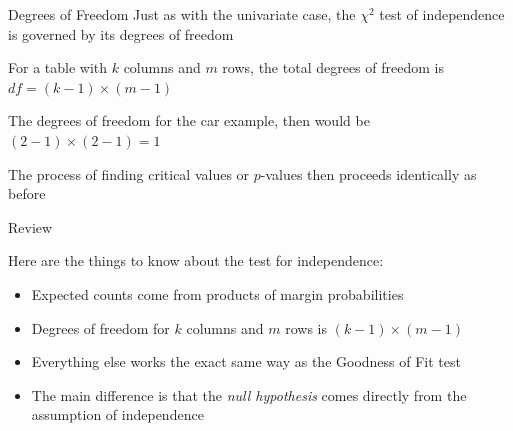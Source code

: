 \documentclass{beamer}
\begin{document}
\begin{frame}{Degrees of Freedom}
Just as with the univariate case, the $\chi^2$ test of independence is governed by its degrees of freedom \\ \vspace{4mm}

For a table with $k$ columns and $m$ rows, the total degrees of freedom is  $df = (k-1)\times(m-1)$ \\ \vspace{8mm}

The degrees of freedom for the car example, then would be $(2-1) \times(2-1) = 1$ \\ \vspace{8mm}

The process of finding critical values or $p$-values then proceeds identically as before 

\end{frame}

\begin{frame}{Review}

Here are the things to know about the test for independence:
\begin{itemize}
\item Expected counts come from products of margin probabilities
\item Degrees of freedom for $k$ columns and $m$ rows is $(k-1) \times (m-1)$
\item Everything else works the exact same way as the Goodness of Fit test
\item The main difference is that the \textit{null hypothesis} comes directly from the assumption of independence
\end{itemize}
\end{frame}
\end{document}
